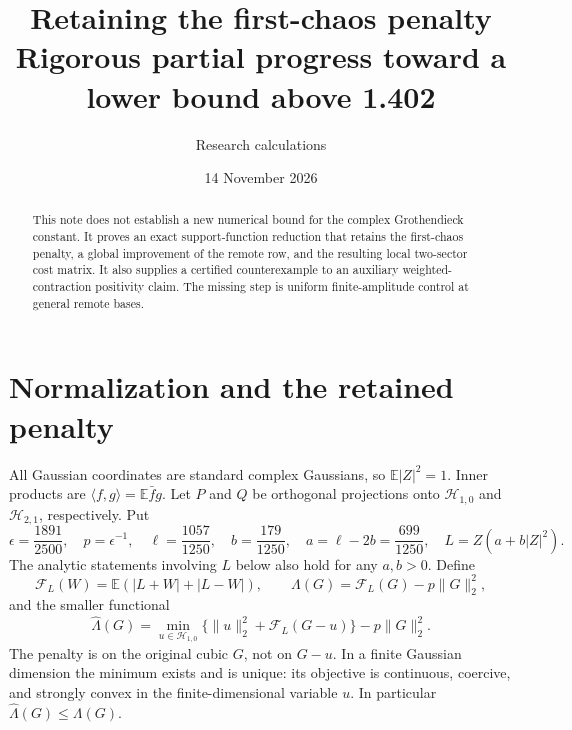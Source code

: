 \documentclass[11pt]{article}
\title{Retaining the first-chaos penalty\\\large Rigorous partial progress toward a lower bound above 1.402}
\author{Research calculations}
\date{14 November 2026}
\newcommand{\E}{\mathbb E}
\newcommand{\HH}{\mathcal H}
\begin{document}
\maketitle
\begin{abstract}
This note does not establish a new numerical bound for the complex
Grothendieck constant. It proves an exact support-function reduction that
retains the first-chaos penalty, a global improvement of the remote row,
and the resulting local two-sector cost matrix. It also supplies a certified
counterexample to an auxiliary weighted-contraction positivity claim.
The missing step is uniform finite-amplitude control at general remote bases.
\end{abstract}

\section{Normalization and the retained penalty}
All Gaussian coordinates are standard complex Gaussians, so
$\E|Z|^2=1$. Inner products are $\langle f,g\rangle=\E\bar f g$.
Let $P$ and $Q$ be orthogonal projections onto $\HH_{1,0}$ and
$\HH_{2,1}$, respectively. Put
\[
 \epsilon=\frac{1891}{2500},\quad p=\epsilon^{-1},\quad
 \ell=\frac{1057}{1250},\quad b=\frac{179}{1250},\quad
 a=\ell-2b=\frac{699}{1250},\quad L=Z(a+b|Z|^2).
\]
The analytic statements involving $L$ below also hold for any $a,b>0$.
Define
\[
 \mathcal F_L(W)=\E(|L+W|+|L-W|),\qquad
 \Lambda(G)=\mathcal F_L(G)-p\|G\|_2^2,
\]
and the smaller functional
\begin{equation}\label{eq:retained}
 \widehat\Lambda(G)=
 \min_{u\in\HH_{1,0}}
 \{\|u\|_2^2+\mathcal F_L(G-u)\}-p\|G\|_2^2.
\end{equation}
The penalty is on the original cubic $G$, not on $G-u$.
In a finite Gaussian dimension the minimum exists and is unique: its objective
is continuous, coercive, and strongly convex in the finite-dimensional variable $u$.
In particular $\widehat\Lambda(G)\le\Lambda(G)$.
\end{document}
